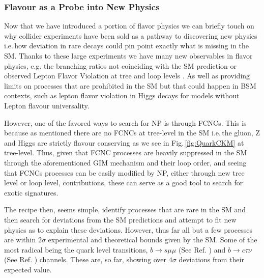 \documentclass[10pt]{report}
\begin{document}
\subsubsection{Flavour as a Probe into New Physics}

Now that we have introduced a portion of flavor physics we can briefly touch on why collider experiments have been sold as a pathway to discovering new physics i.e.\,how deviation in rare decays could pin point exactly what is missing in the SM. 
%
Thanks to these large experiments we have many new observables in flavor physics, e.g. the branching ratios not coinciding with the SM prediction \cite{CasteloBranco2014} or observed Lepton Flavor Violation at tree and loop levels \cite{Graverini2019}. 
%
As well as providing limits on processes that are prohibited in the SM but that could happen in BSM contexts, such as lepton flavor violation in Higgs decays for models without Lepton flavour universality. 

However, one of the favored ways to search for NP is through FCNCs. 
%
This is because as mentioned there are no FCNCs at tree-level in the SM i.e.\,the gluon, Z and Higgs are strictly flavour conserving as we see in Fig.\,\ref{fig:QuarkCKM} at tree-level.
%
Thus, given that FCNC processes are heavily suppressed in the SM through the aforementioned GIM mechanism and their loop order, and seeing that FCNCs processes can be easily modified by NP, either through new tree level or loop level, contributions, these can serve as a good tool to search for exotic signatures. 

The recipe then, seems simple, identify processes that are rare in the SM and then search for deviations from the SM predictions and attempt to fit new physics as to explain these deviations. 
%
However, thus far all but a few processes are within $2\sigma$ experimental and theoretical bounds given by the SM.
%
Some of the most radical being the quark level transitions, $b \rightarrow s \mu \mu$ (See Ref. \cite{DAmico2017}) and $b \rightarrow c \tau \nu$ (See Ref. \cite{Hu2019}) channels.
%
These are, so far, showing over $ 4 \sigma$ deviations from their expected value. 
\end{document}

